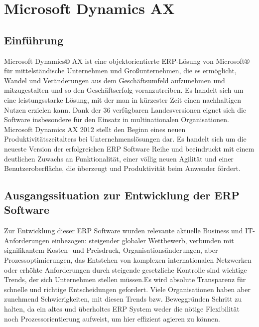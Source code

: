 
%
\begin{sloppypar}

\section{Microsoft Dynamics AX}


\subsection{Einführung}
Microsoft Dynamics® AX ist eine objektorientierte ERP-Lösung von Microsoft® für mittelständische Unternehmen und Großunternehmen, die es ermöglicht, Wandel und Veränderungen aus dem Geschäftsumfeld aufzunehmen und mitzugestalten und so den Geschäftserfolg voranzutreiben. Es handelt sich um eine leistungsstarke Lösung, mit der man in kürzester Zeit einen nachhaltigen Nutzen erzielen kann.
Dank der 36 verfügbaren Landesversionen eignet sich die Software insbesondere für den Einsatz in multinationalen Organisationen.
Microsoft Dynamics AX 2012 stellt den Beginn eines neuen Produktivitätszeitalters bei Unternehmenslösungen dar. Es handelt sich um die neueste Version der erfolgreichen ERP Software Reihe und beeindruckt mit einem deutlichen Zuwachs an Funktionalität, einer völlig neuen Agilität und einer Benutzeroberfläche, die überzeugt und Produktivität beim Anwender fördert.


\subsection{Ausgangssituation zur Entwicklung der ERP Software}
Zur Entwicklung dieser ERP Software wurden relevante aktuelle Business und IT-Anforderungen einbezogen: steigender globaler Wettbewerb, verbunden mit signifikantem Kosten- und Preisdruck, Organisationsänderungen, aber Prozessoptimierungen, das Entstehen von komplexen internationalen Netzwerken oder erhöhte Anforderungen durch steigende gesetzliche Kontrolle sind wichtige Trends, der sich Unternehmen stellen müssen.Es wird absolute Transparenz für schnelle und richtige Entscheidungen gefordert.
Viele Organisationen haben aber zunehmend Schwierigkeiten, mit diesen Trends bzw. Beweggründen Schritt zu halten, da ein altes und überholtes ERP System weder die nötige Flexibilität noch Prozessorientierung aufweist, um hier effizient agieren zu können.



\end{sloppypar}
